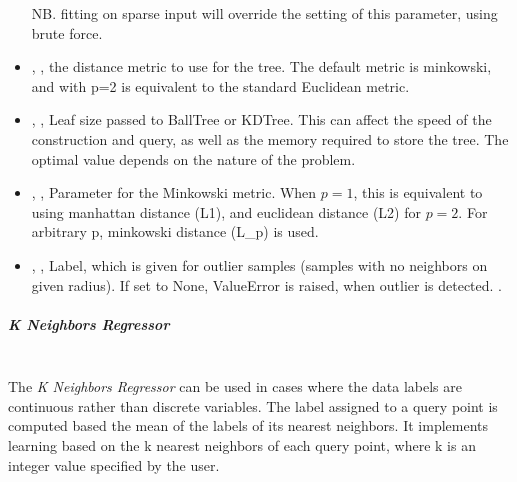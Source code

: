\begin{itemize}
  NB.
  fitting on sparse input will override the setting of this parameter, using
  brute force.
  \item {}, ,
  the distance metric to use for the tree.
  The default metric is minkowski, and with p=2 is equivalent to the standard
  Euclidean metric.
  \item {}, ,
  Leaf size passed to BallTree or KDTree.
  This can affect the speed of the construction and query, as well as the memory
  required to store the tree.
  The optimal value depends on the nature of the problem.
  \item {}, ,
  Parameter for the Minkowski metric.
  When $p = 1$, this is equivalent to using manhattan distance (L1), and
  euclidean distance (L2) for $p = 2$.
  For arbitrary p, minkowski distance (L\_p) is used.
  \item {}, ,
  Label, which is given for outlier samples (samples with no neighbors on given
  radius).
  If set to None, ValueError is raised, when outlier is detected.
  .
\end{itemize}
\subparagraph{K Neighbors Regressor}
\mbox{}
\\The \textit{K Neighbors Regressor} can be used in cases where the data labels
are continuous rather than discrete variables.
%
The label assigned to a query point is computed based the mean of the labels of
its nearest neighbors.
%
It implements learning based on the k nearest neighbors of each query point,
where k is an integer value specified by the user.
%
